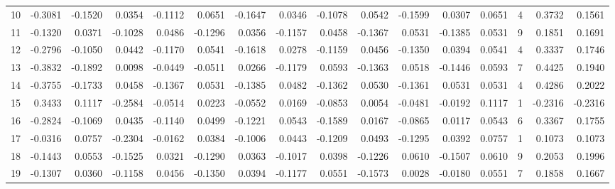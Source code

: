 \begin{tabular}{lrrrrrrrrrrrrrrr}
10 &     -0.3081 & -0.1520 &  0.0354 & -0.1112 &  0.0651 & -0.1647 &  0.0346 & -0.1078 &  0.0542 & -0.1599 &   0.0307 &     0.0651 &      4 &                    0.3732 &                     0.1561 \\
11 &     -0.1320 &  0.0371 & -0.1028 &  0.0486 & -0.1296 &  0.0356 & -0.1157 &  0.0458 & -0.1367 &  0.0531 &  -0.1385 &     0.0531 &      9 &                    0.1851 &                     0.1691 \\
12 &     -0.2796 & -0.1050 &  0.0442 & -0.1170 &  0.0541 & -0.1618 &  0.0278 & -0.1159 &  0.0456 & -0.1350 &   0.0394 &     0.0541 &      4 &                    0.3337 &                     0.1746 \\
13 &     -0.3832 & -0.1892 &  0.0098 & -0.0449 & -0.0511 &  0.0266 & -0.1179 &  0.0593 & -0.1363 &  0.0518 &  -0.1446 &     0.0593 &      7 &                    0.4425 &                     0.1940 \\
14 &     -0.3755 & -0.1733 &  0.0458 & -0.1367 &  0.0531 & -0.1385 &  0.0482 & -0.1362 &  0.0530 & -0.1361 &   0.0531 &     0.0531 &      4 &                    0.4286 &                     0.2022 \\
15 &      0.3433 &  0.1117 & -0.2584 & -0.0514 &  0.0223 & -0.0552 &  0.0169 & -0.0853 &  0.0054 & -0.0481 &  -0.0192 &     0.1117 &      1 &                   -0.2316 &                    -0.2316 \\
16 &     -0.2824 & -0.1069 &  0.0435 & -0.1140 &  0.0499 & -0.1221 &  0.0543 & -0.1589 &  0.0167 & -0.0865 &   0.0117 &     0.0543 &      6 &                    0.3367 &                     0.1755 \\
17 &     -0.0316 &  0.0757 & -0.2304 & -0.0162 &  0.0384 & -0.1006 &  0.0443 & -0.1209 &  0.0493 & -0.1295 &   0.0392 &     0.0757 &      1 &                    0.1073 &                     0.1073 \\
18 &     -0.1443 &  0.0553 & -0.1525 &  0.0321 & -0.1290 &  0.0363 & -0.1017 &  0.0398 & -0.1226 &  0.0610 &  -0.1507 &     0.0610 &      9 &                    0.2053 &                     0.1996 \\
19 &     -0.1307 &  0.0360 & -0.1158 &  0.0456 & -0.1350 &  0.0394 & -0.1177 &  0.0551 & -0.1573 &  0.0028 &  -0.0180 &     0.0551 &      7 &                    0.1858 &                     0.1667 \\
\bottomrule
\end{tabular}
